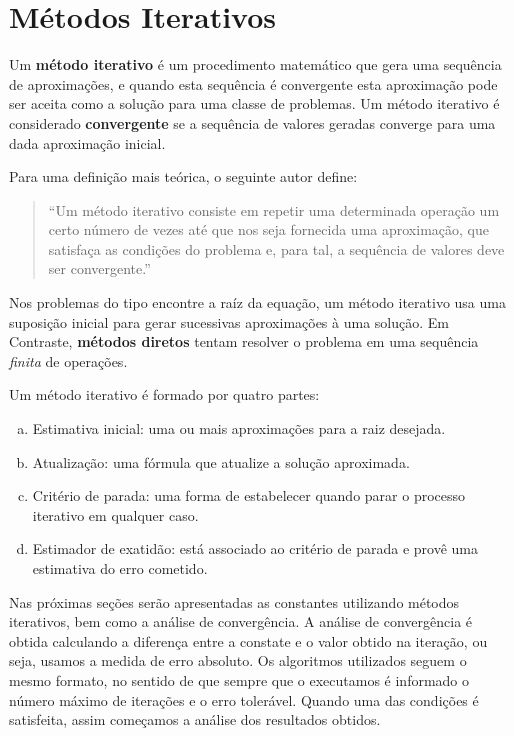 \section{Métodos Iterativos}
\label{sec:metodos-iterativos}

	Um \textbf{método iterativo} é um procedimento matemático que gera uma
	sequência de aproximações, e quando esta sequência é convergente esta
	aproximação pode ser aceita como a solução para uma classe de problemas. Um
	método iterativo é considerado \textbf{convergente} se a sequência de
	valores geradas converge para uma dada aproximação inicial.

	Para uma definição mais teórica, o seguinte autor define:

	\begin{quotation}

		``Um método iterativo consiste em repetir uma determinada operação um
		certo número de vezes até que nos seja fornecida uma aproximação, que
		satisfaça as condições do problema e, para tal, a sequência de valores
		deve ser convergente.''\cite{batista2014metodos}

	\end{quotation}

	Nos problemas do tipo encontre a raíz da equação, um método iterativo usa
	uma suposição inicial para gerar sucessivas aproximações à uma solução. Em
	Contraste, \textbf{métodos diretos} tentam resolver o problema em uma
	sequência \emph{finita} de operações.

	Um método iterativo é formado por quatro partes:~\cite{claudio2000calculo}

	\begin{enumerate}[a)]

		\item Estimativa inicial: uma ou mais aproximações para a raiz desejada.

		\item Atualização: uma fórmula que atualize a solução aproximada.

		\item Critério de parada: uma forma de estabelecer quando parar o
			processo iterativo em qualquer caso.

		\item Estimador de exatidão: está associado ao critério de parada e
			provê uma estimativa do erro cometido.

	\end{enumerate}

	Nas próximas seções serão apresentadas as constantes utilizando métodos
	iterativos, bem como a análise de convergência. A análise de convergência é
	obtida calculando a diferença entre a constate e o valor obtido na iteração,
	ou seja, usamos a medida de erro absoluto. Os algoritmos utilizados seguem o
	mesmo formato, no sentido de que sempre que o executamos é informado o
	número máximo de iterações e o erro tolerável. Quando uma das condições é
	satisfeita, assim começamos a análise dos resultados obtidos.

